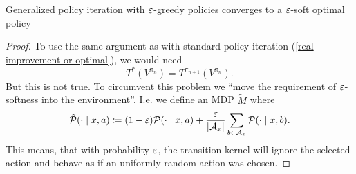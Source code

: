 \begin{prop}
	Generalized policy iteration with \(\varepsilon\)-greedy policies converges to a \(\varepsilon\)-soft optimal policy
\end{prop}
\begin{proof}
	To use the same argument as with standard policy iteration (\ref{real improvement or optimal}), we would need
	\[
		T^*(V^{\pi_n})=T^{\pi_{n+1}}(V^{\pi_n}).
	\]
	But this is not true. To circumvent this problem we ``move the requirement of \(\varepsilon\)-softness into the environment''. I.e. we define an MDP \(\tilde{M}\) where
	\[
		\tilde{\mathcal{P}}(\cdot \mid x,a) \coloneqq (1-\varepsilon) \mathcal{P}(\cdot \mid x,a) 
		+ \frac{\varepsilon}{|\mathcal{A}_x|}\sum_{b\in\mathcal{A}_x} \mathcal{P}(\cdot \mid x,b).
	\]
	This means, that with probability \(\varepsilon\), the transition kernel will ignore the selected action and behave as if an uniformly random action was chosen.	
	

\end{proof}
